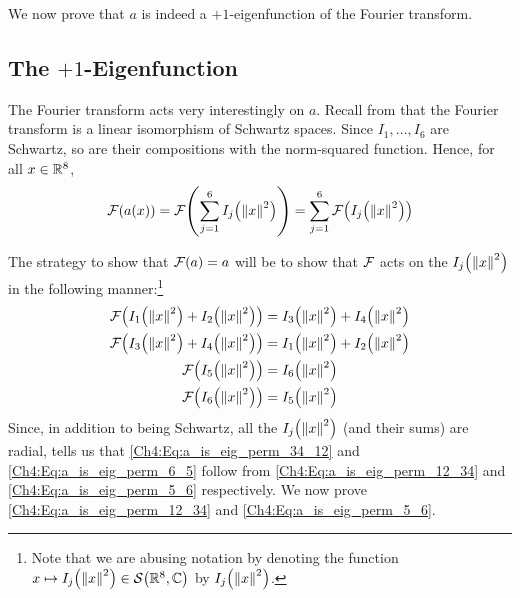 We now prove that $a$ is indeed a $+1$-eigenfunction of the Fourier transform.

\subsection{The $+1$-Eigenfunction}

The Fourier transform acts very interestingly on $a$. Recall from  that the Fourier transform is a linear isomorphism of Schwartz spaces. Since $I_1, \ldots, I_6$ are Schwartz, so are their compositions with the norm-squared function. Hence, for all $x \in \mathbb{R}^8$,
\begin{align*}
    \mathcal{F}\!\left( a(x) \right)
    = \mathcal{F}\!\left( \sum_{j=1}^{6} I_j\!\left( \left\lVert x \right\rVert^2 \right) \right)
    = \sum_{j=1}^{6} \mathcal{F}\!\left( I_j\!\left( \left\lVert x \right\rVert^2 \right) \right)
\end{align*}

The strategy to show that $\mathcal{F}\!\left( a \right) = a$ will be to show that $\mathcal{F}$ acts on the $I_j\!\left( \left\lVert x \right\rVert^2 \right)$ in the following manner:\footnote{Note that we are abusing notation by denoting the function $x \mapsto I_j\!\left( \left\lVert x \right\rVert^2 \right) \in \mathcal{S}\!\left( \mathbb{R}^8, \mathbb{C} \right)$ by $I_j\!\left( \left\lVert x \right\rVert^2 \right)$.}
\begin{align}
    \F\of{I_1\of{\norm{x}^2} + I_2\of{\norm{x}^2}} &= I_3\of{\norm{x}^2} + I_4\of{\norm{x}^2} \label{Ch4:Eq:a_is_eig_perm_12_34} \\
    \F\of{I_3\of{\norm{x}^2} + I_4\of{\norm{x}^2}} &= I_1\of{\norm{x}^2} + I_2\of{\norm{x}^2} \label{Ch4:Eq:a_is_eig_perm_34_12} \\
    \F\of{I_5\of{\norm{x}^2}} &= I_6\of{\norm{x}^2} \label{Ch4:Eq:a_is_eig_perm_5_6} \\
    \F\of{I_6\of{\norm{x}^2}} &= I_5\of{\norm{x}^2} \label{Ch4:Eq:a_is_eig_perm_6_5}
\end{align}
Since, in addition to being Schwartz, all the $I_j\!\left( \left\lVert x \right\rVert^2 \right)$ (and their sums) are radial,  tells us that \eqref{Ch4:Eq:a_is_eig_perm_34_12} and \eqref{Ch4:Eq:a_is_eig_perm_6_5} follow from \eqref{Ch4:Eq:a_is_eig_perm_12_34} and \eqref{Ch4:Eq:a_is_eig_perm_5_6} respectively. We now prove \eqref{Ch4:Eq:a_is_eig_perm_12_34} and \eqref{Ch4:Eq:a_is_eig_perm_5_6}.

